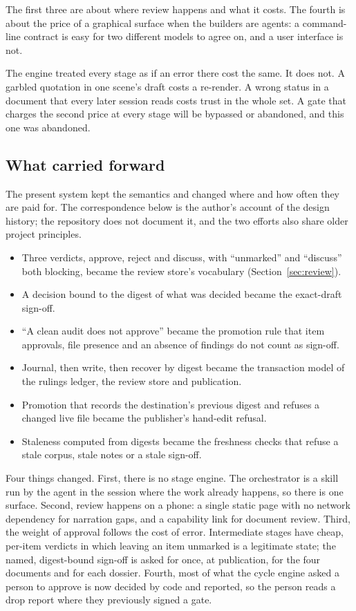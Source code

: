 \documentclass[11pt]{article}
\begin{document}
The first three are about where review happens and what it costs. The fourth is about
the price of a graphical surface when the builders are agents: a command-line contract
is easy for two different models to agree on, and a user interface is not.

The engine treated every stage as if an error there cost the same. It does not. A
garbled quotation in one scene's draft costs a re-render. A wrong status in a document
that every later session reads costs trust in the whole set. A gate that charges the
second price at every stage will be bypassed or abandoned, and this one was abandoned.

\subsection{What carried forward}

The present system kept the semantics and changed where and how often they are paid for.
The correspondence below is the author's account of the design history; the repository
does not document it, and the two efforts also share older project principles.

\begin{itemize}[nosep]
\item Three verdicts, approve, reject and discuss, with ``unmarked'' and ``discuss''
both blocking, became the review store's vocabulary (Section~\ref{sec:review}).
\item A decision bound to the digest of what was decided became the exact-draft
sign-off.
\item ``A clean audit does not approve'' became the promotion rule that item approvals,
file presence and an absence of findings do not count as sign-off.
\item Journal, then write, then recover by digest became the transaction model of the
rulings ledger, the review store and publication.
\item Promotion that records the destination's previous digest and refuses a changed
live file became the publisher's hand-edit refusal.
\item Staleness computed from digests became the freshness checks that refuse a stale
corpus, stale notes or a stale sign-off.
\end{itemize}

Four things changed. First, there is no stage engine. The orchestrator is a skill run by
the agent in the session where the work already happens, so there is one surface. Second,
review happens on a phone: a single static page with no network dependency for narration
gaps, and a capability link for document review. Third, the weight of approval follows
the cost of error. Intermediate stages have cheap, per-item verdicts in which leaving an
item unmarked is a legitimate state; the named, digest-bound sign-off is asked for once,
at publication, for the four documents and for each dossier. Fourth, most of what the
cycle engine asked a person to approve is now decided by code and reported, so the
person reads a drop report where they previously signed a gate.
\end{document}
